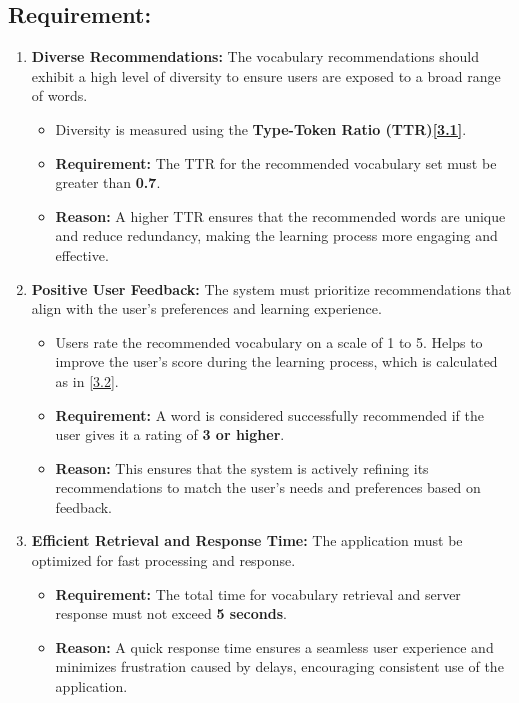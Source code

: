 \documentclass{article}
\begin{document}
    
\subsection{Requirement:}


\begin{enumerate}
    \item \textbf{Diverse Recommendations:}  
    The vocabulary recommendations should exhibit a high level of diversity to ensure users are exposed to a broad range of words.  
    \begin{itemize}
        \item Diversity is measured using the \textbf{Type-Token Ratio (TTR)\hyperref[sec:TTR]{[3.1]}}.
        \item \textbf{Requirement:} The TTR for the recommended vocabulary set must be greater than \textbf{0.7}.
        \item \textbf{Reason:} A higher TTR ensures that the recommended words are unique and reduce redundancy, making the learning process more engaging and effective.
    \end{itemize}
    
    \item \textbf{Positive User Feedback:}  
    The system must prioritize recommendations that align with the user’s preferences and learning experience.
    \begin{itemize}
        \item Users rate the recommended vocabulary on a scale of 1 to 5. Helps to improve the user's score during the learning process, which is calculated as in \hyperref[sec:confidence-score]{[3.2]}.
        \item \textbf{Requirement:} A word is considered successfully recommended if the user gives it a rating of \textbf{3 or higher}.
        \item \textbf{Reason:} This ensures that the system is actively refining its recommendations to match the user’s needs and preferences based on feedback.
    \end{itemize}
    
    \item \textbf{Efficient Retrieval and Response Time:}  
    The application must be optimized for fast processing and response.
    \begin{itemize}
        \item \textbf{Requirement:} The total time for vocabulary retrieval and server response must not exceed \textbf{5 seconds}.
        \item \textbf{Reason:} A quick response time ensures a seamless user experience and minimizes frustration caused by delays, encouraging consistent use of the application.
    \end{itemize}
\end{enumerate}
\end{document}
